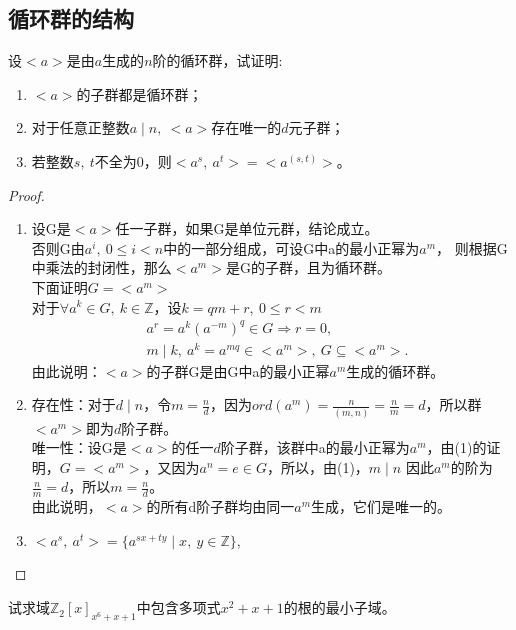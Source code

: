 \documentclass[cn,10pt]{elegantbook}
\begin{document}
\subsection{循环群的结构}
\begin{theorem}
  设$<a>$是由$a$生成的$n$阶的循环群，试证明:
  \begin{enumerate}[(1)]
    \item $<a>$的子群都是循环群；
    \item 对于任意正整数$a \mid n,\ <a>$存在唯一的$d$元子群；
    \item 若整数$s,\ t $不全为$0$，则$<a^s,\ a^t>=<a^{(s,t)}>$。
  \end{enumerate}
\end{theorem}
\begin{proof}
  \begin{enumerate}[(1)]
    \item 设G是$<a>$任一子群，如果G是单位元群，结论成立。\\ 否则G由$a^i,\ 0 \leq i < n$中的一部分组成，可设G中a的最小正幂为$a^m$，
    则根据G中乘法的封闭性，那么$<a^m>$是G的子群，且为循环群。\\
    下面证明$G = <a^m>$\\
    对于$\forall a^k \in G,\ k \in \mathbb{Z}$，设$k = qm+r,\ 0 \leq r <m$
    \begin{align*}
      &a^r = a^k(a^{-m})^q \in G \Rightarrow r =0 ,
      \\&m \mid k,\ a^k = a^{mq} \in <a^m>,\ G \subseteq <a^m>.
    \end{align*}
    由此说明：$<a>$的子群G是由G中a的最小正幂$a^m$生成的循环群。
    \item 存在性：对于$d \mid n$，令$m = \frac{n}{d}$，因为$ord(a^m)= \frac{n}{(m,n)} = \frac{n}{m}= d$，所以群$<a^m>$即为$d$阶子群。
    \\唯一性：设G是$<a>$的任一$d$阶子群，该群中a的最小正幂为$a^m$，由(1)的证明，$G = <a^m>$，又因为$a^n =e \in G$，所以，由(1)，$m \mid n$
    因此$a^m$的阶为$\frac{n}{m} = d$，所以$m = \frac{n}{d}$。
    \\由此说明，$<a>$的所有d阶子群均由同一$a^m$生成，它们是唯一的。
    \item $<a^s,\ a^t>= \{a^{sx+ty}\mid x,\ y \in \mathbb{Z} \}$,
    \\
    \end{enumerate}
\end{proof}
\begin{example}
  试求域$\mathbb{Z}_2[x]_{x^6+x+1}$中包含多项式$x^2+x+1$的根的最小子域。
\end{example}
\begin{solution}
  
\end{solution}
\end{document}
